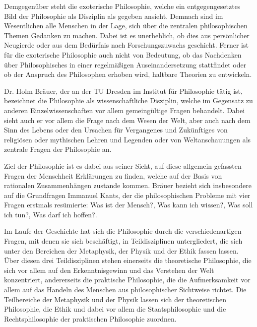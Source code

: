 Demgegenüber steht die exoterische Philosophie, welche ein entgegengesetztes Bild der Philosophie als Disziplin als gegeben ansieht. 
Demnach sind im Wesentlichen alle Menschen in der Lage, sich über die zentralen philosophischen Themen Gedanken zu machen. 
Dabei ist es unerheblich, ob dies aus persönlicher Neugierde oder aus dem Bedürfnis nach Forschungszuwachs geschieht. 
Ferner ist für die exoterische Philosophie auch nicht von Bedeutung, ob das Nachdenken über Philosophisches in einer regelmäßigen Auseinandersetzung stattfindet oder ob der Anspruch des Philosophen erhoben wird, haltbare Theorien zu entwickeln\cite[S.\,8]{BB10}.

Dr. Holm Bräuer, der an der TU Dresden im Institut für Philosophie tätig ist, bezeichnet die Philosophie als wissenschaftliche Disziplin, welche im Gegensatz zu anderen Einzelwissenschaften vor allem gemeingültige Fragen behandelt.
 Dabei sieht auch er vor allem die Frage nach dem Wesen der Welt, aber auch nach dem Sinn des Lebens oder den Ursachen für \glqq Vergangenes und Zukünftiges von religiösen oder mythischen Lehren und Legenden oder von Weltanschauungen\grqq{} \cite{PL16} als zentrale Fragen der Philosophie an.

 Ziel der Philosophie ist es dabei aus seiner Sicht, auf diese allgemein gefassten Fragen der Menschheit Erklärungen zu finden, welche auf der Basis von rationalen Zusammenhängen zustande kommen.
  Bräuer bezieht sich insbesondere auf die Grundfragen Immanuel Kants, der die philosophischen Probleme mit vier Fragen erstmals resümierte: \glqq Was ist der Mensch?\grqq{}, \glqq Was kann ich wissen?\grqq{}, \glqq Was soll ich tun?\grqq{}, \glqq Was darf ich hoffen?\grqq{}.  
  
Im Laufe der Geschichte hat sich die Philosophie durch die verschiedenartigen Fragen, mit denen sie sich beschäftigt, in Teildisziplinen untergliedert, die sich unter den Bereichen der Metaphysik, der Physik und der Ethik fassen lassen. 
Über diesen drei Teildisziplinen stehen einerseits die theoretische Philosophie, die sich vor allem auf den Erkenntnisgewinn und das Verstehen der Welt konzentriert, andererseits die praktische Philosophie, die die Aufmerksamkeit vor allem auf das Handeln des Menschen aus philosophischer Sichtweise richtet. 
Die Teilbereiche der Metaphysik und der Physik lassen sich der theoretischen Philosophie, die Ethik und dabei vor allem die Staatsphilosophie und die Rechtsphilosophie der praktischen Philosophie zuordnen. 

